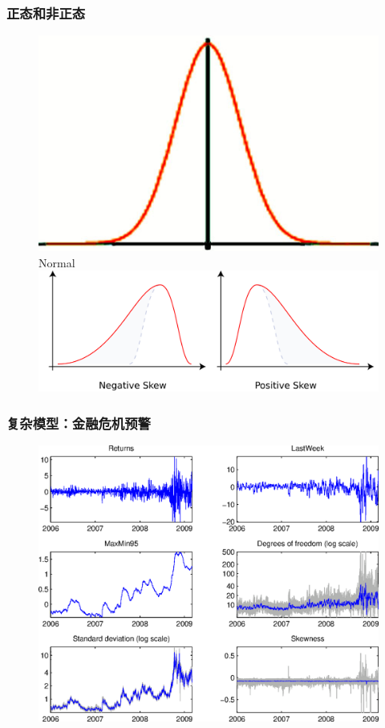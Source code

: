 \documentclass[11pt]{beamer}
\begin{document}
\begin{frame}
  \frametitle{正态和非正态}
  \begin{figure}
    \centering
     \includegraphics[height=0.35\textheight]{normal}\\
     Normal\\
     \includegraphics[height=0.35\textheight]{skew}
  \end{figure}
\end{frame}


\begin{frame}
  \frametitle{复杂模型：金融危机预警}
  \begin{figure}
    \centering
    \includegraphics[height=0.85\textheight]{MomentPlotSP5002}
  \end{figure}
\end{frame}
\end{document}
